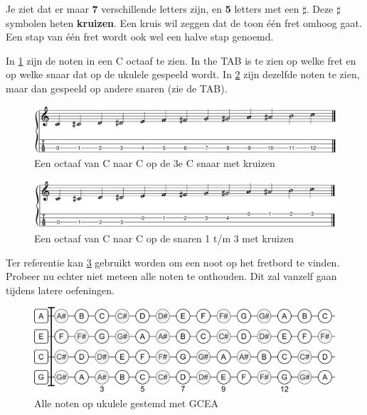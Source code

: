 Je ziet dat er maar \textbf{7} verschillende letters zijn, en \textbf{5} letters met een \textbf{$\sharp$}. Deze $\sharp$ symbolen heten \textbf{kruizen}. Een kruis wil zeggen dat de toon één fret omhoog gaat. Een stap van één fret wordt ook wel een halve stap genoemd.


In \ref{fig:ukulele_single_string_octave_sharps} zijn de noten in een C octaaf te zien. In the TAB is te zien op welke fret en op welke snaar dat op de ukulele gespeeld wordt. In \ref{fig:ukulele_multi_string_octave_sharps} zijn dezelfde noten te zien, maar dan gespeeld op andere snaren (zie de TAB).

\begin{figure}[h]
    \centering
    \includegraphics[width=\textwidth]{image/UkuleleChromaticNotesSharpsSingleString.png}
    \caption{Een octaaf van C naar C op de 3e C snaar met kruizen}
    \label{fig:ukulele_single_string_octave_sharps}
\end{figure}

\begin{figure}[h]
    \centering
    \includegraphics[width=\textwidth]{image/UkuleleChromaticNotesSharpsMultiString.png}
    \caption{Een octaaf van C naar C op de snaren 1 t/m 3 met kruizen}
    \label{fig:ukulele_multi_string_octave_sharps}
\end{figure}

\newpage

Ter referentie kan \ref{fig:ukulele_fretboard_filled} gebruikt worden om een noot op het fretbord te vinden. Probeer nu echter niet meteen alle noten te onthouden. Dit zal vanzelf gaan tijdens latere oefeningen.

\begin{figure}[h]
    \centering
    \includegraphics[width=\textwidth]{image/Fretboard-Ukulele-filled.png}
    \caption{Alle noten op ukulele gestemd met GCEA}
    \label{fig:ukulele_fretboard_filled}
\end{figure}

